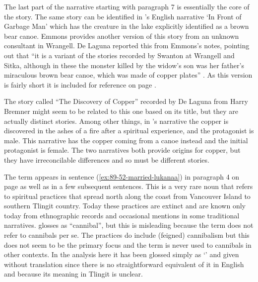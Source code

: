 The last part of the narrative starting with paragraph 7 is essentially the core of the  story.
The same story can be identified in ’s English narrative  ‘In Front of Garbage Man’ \parencite[132–133]{swanton:1909} which has the creature in the lake explicitly identified as a brown bear canoe.
Emmons provides another version of this story from an unknown consultant in Wrangell. De Laguna reported this from Emmons’s notes, pointing out that “it is a variant of the stories recorded by Swanton at Wrangell and Sitka, although in these the monster killed by the widow’s son was her father’s miraculous brown bear canoe, which was made of copper plates” \parencite[180]{emmons:1991}. As this version is fairly short it is included for reference on page \pageref{sec:89-emmons-version}.

The story called “The Discovery of Copper” recorded by De Laguna from  Harry Bremner \parencite[899–900]{de-laguna:1972} might seem to be related to this one based on its title, but they are actually distinct stories.
Among other things, in ’s narrative the copper is discovered in the ashes of a fire after a spiritual experience, and the protagonist is male.
This narrative has the copper coming from a canoe instead and the initial protagonist is female.
The two narratives both provide origins for copper, but they have irreconcilable differences and so must be different stories.

The term  appears in sentence (\ref{ex:89-52-married-lukanaa}) in paragraph 4 on page \pageref{ex:89-52-married-lukanaa} as well as in a few subsequent sentences.
This is a very rare noun that refers to spiritual practices that spread north along the coast from Vancouver Island to southern Tlingit country.
Today these practices are extinct and are known only today from ethnographic records and occasional mentions in some traditional narratives.
\citeauthor{swanton:1909} glosses  as “cannibal”, but this is misleading because the term does not refer to cannibals per se.
The  practices do include (feigned) cannibalism but this does not seem to be the primary focus and the term  is never used to cannibals in other contexts.
In the analysis here it has been glossed simply as ‘’ and given without translation since there is no straightforward equivalent of it in English and because its meaning in Tlingit is unclear.

